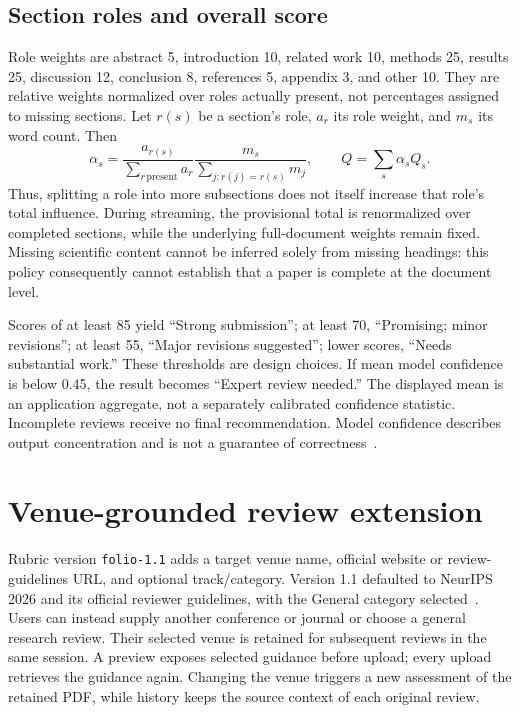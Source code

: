\documentclass[11pt]{article}
\newcommand{\code}[1]{\texttt{#1}}
\begin{document}
\subsection{Section roles and overall score}
Role weights are abstract 5, introduction 10, related work 10, methods 25, results 25, discussion 12, conclusion 8, references 5, appendix 3, and other 10. They are relative weights normalized over roles actually present, not percentages assigned to missing sections. Let $r(s)$ be a section's role, $a_r$ its role weight, and $m_s$ its word count. Then
\begin{equation}
\alpha_s=\frac{a_{r(s)}}{\sum_{r\,\mathrm{present}}a_r}
\frac{m_s}{\sum_{j:r(j)=r(s)}m_j},\qquad
Q=\sum_s\alpha_s Q_s.
\end{equation}
Thus, splitting a role into more subsections does not itself increase that role's total influence. During streaming, the provisional total is renormalized over completed sections, while the underlying full-document weights remain fixed. Missing scientific content cannot be inferred solely from missing headings: this policy consequently cannot establish that a paper is complete at the document level.

Scores of at least 85 yield ``Strong submission''; at least 70, ``Promising; minor revisions''; at least 55, ``Major revisions suggested''; lower scores, ``Needs substantial work.'' These thresholds are design choices. If mean model confidence is below 0.45, the result becomes ``Expert review needed.'' The displayed mean is an application aggregate, not a separately calibrated confidence statistic. Incomplete reviews receive no final recommendation. Model confidence describes output concentration and is not a guarantee of correctness~\cite{confidence}.

\section{Venue-grounded review extension}
Rubric version \code{folio-1.1} adds a target venue name, official website or review-guidelines URL, and optional track/category. Version 1.1 defaulted to NeurIPS 2026 and its official reviewer guidelines, with the General category selected~\cite{neurips}. Users can instead supply another conference or journal or choose a general research review. Their selected venue is retained for subsequent reviews in the same session. A preview exposes selected guidance before upload; every upload retrieves the guidance again. Changing the venue triggers a new assessment of the retained PDF, while history keeps the source context of each original review.
\end{document}
